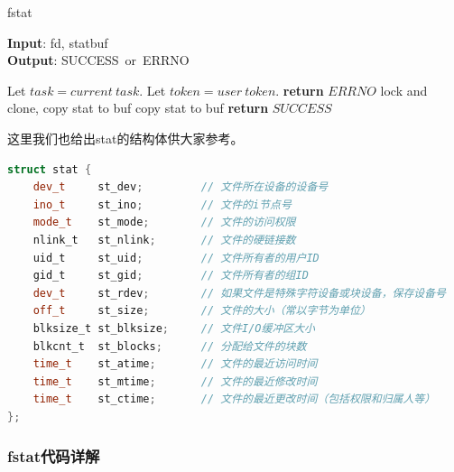 \begin{algorithm}[tb]
    \caption{fstat}
    \label{alg:algorithm}
    \textbf{Input}: fd, statbuf\\
    \textbf{Output}: SUCCESS~or~ERRNO
    \begin{algorithmic}[1] %

        \State Let $task=current~task$.
        \State Let $token=user~token$.
        \State \textbf{return} $ERRNO$
        \Else {}
        \State lock and clone, copy stat to buf
        \Else
        \State copy stat to buf
        \EndIf
        \State \textbf{return} $SUCCESS$
        \EndIf
    \end{algorithmic}
\end{algorithm}


这里我们也给出stat的结构体供大家参考。

\begin{lstlisting}[language={Rust}, 
	caption={stat示意结构体}]
    struct stat {
    dev_t     st_dev;         // 文件所在设备的设备号
    ino_t     st_ino;         // 文件的i节点号
    mode_t    st_mode;        // 文件的访问权限
    nlink_t   st_nlink;       // 文件的硬链接数
    uid_t     st_uid;         // 文件所有者的用户ID
    gid_t     st_gid;         // 文件所有者的组ID
    dev_t     st_rdev;        // 如果文件是特殊字符设备或块设备，保存设备号
    off_t     st_size;        // 文件的大小（常以字节为单位）
    blksize_t st_blksize;     // 文件I/O缓冲区大小
    blkcnt_t  st_blocks;      // 分配给文件的块数
    time_t    st_atime;       // 文件的最近访问时间
    time_t    st_mtime;       // 文件的最近修改时间
    time_t    st_ctime;       // 文件的最近更改时间（包括权限和归属人等）
};
\end{lstlisting}


\subsubsection{fstat代码详解}

